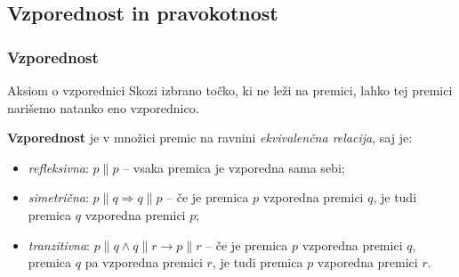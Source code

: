 
    \subsection{Vzporednost in pravokotnost}

        \begin{frame}
            \frametitle{Vzporednost}
            
            \begin{alertblock}{Aksiom o vzporednici}
                Skozi izbrano točko, ki ne leži na premici, lahko tej premici narišemo natanko eno vzporednico.

                \begin{figure}[H]

                \end{figure}

            \end{alertblock}

            \begin{block}{}
                \textbf{Vzporednost} je v množici premic na ravnini \textit{ekvivalenčna relacija}, saj je:
                \begin{itemize}
                    \item \textit{refleksivna}: $p\parallel p$ -- vsaka premica je vzporedna sama sebi;
                    \item \textit{simetrična}: $p\parallel q \Rightarrow q\parallel p$ -- če je premica $p$ vzporedna premici $q$, je tudi premica $q$ vzporedna premici $p$;
                    \item \textit{tranzitivna}: $p\parallel q \land q \parallel r \rightarrow p \parallel r$ -- če je premica $p$ vzporedna premici $q$, premica $q$ pa vzporedna premici $r$, 
                        je tudi premica $p$ vzporedna premici $r$.
                \end{itemize}
            \end{block}

        \end{frame}

